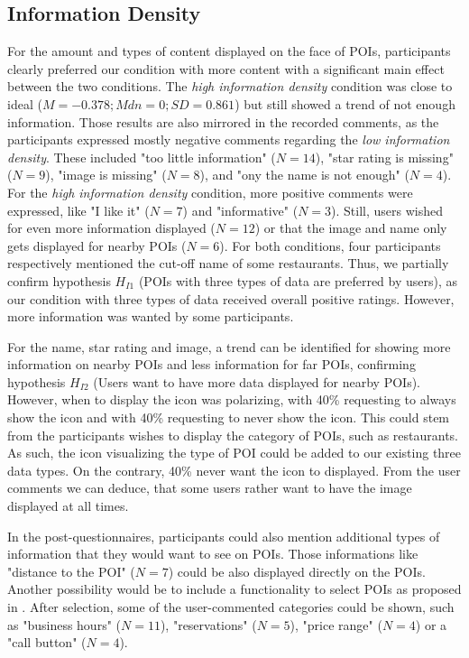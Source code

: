 \subsection{Information Density}
For the amount and types of content displayed on the face of POIs, participants clearly preferred our condition with more content with a significant main effect between the two conditions. The \textit{high information density} condition was close to ideal ($M=-0.378; Mdn=0; SD=0.861$) but still showed a trend of not enough information. Those results are also mirrored in the recorded comments, as the participants expressed mostly negative comments regarding the \textit{low information density}. These included "too little information" ($N=14$), "star rating is missing" ($N=9$), "image is missing" ($N=8$), and "ony the name is not enough" ($N=4$). For the \textit{high information density} condition, more positive comments were expressed, like "I like it" ($N=7$) and "informative" ($N=3$). Still, users wished for even more information displayed ($N=12$) or that the image and name only gets displayed for nearby POIs ($N=6$). For both conditions, four participants respectively mentioned the cut-off name of some restaurants. Thus, we partially confirm hypothesis $H_{I1}$ (POIs with three types of data are preferred by users), as our condition with three types of data received overall positive ratings. However, more information was wanted by some participants.

For the name, star rating and image, a trend can be identified for showing more information on nearby POIs and less information for far POIs, confirming hypothesis $H_{I2}$ (Users want to have more data displayed for nearby POIs). However, when to display the icon was polarizing, with 40\% requesting to always show the icon and with 40\% requesting to never show the icon. This could stem from the participants wishes to display the category of POIs, such as restaurants. As such, the icon visualizing the type of POI could be added to our existing three data types. On the contrary, 40\% never want the icon to displayed. From the user comments we can deduce, that some users rather want to have the image displayed at all times.

In the post-questionnaires, participants could also mention additional types of information that they would want to see on POIs. Those informations like "distance to the POI" ($N=7$) could be also displayed directly on the POIs. Another possibility would be to include a functionality to select POIs as proposed in \cite{Schramm23Assessing}. After selection, some of the user-commented categories could be shown, such as "business hours" ($N=11$), "reservations" ($N=5$), "price range" ($N=4$) or a "call button" ($N=4$).

